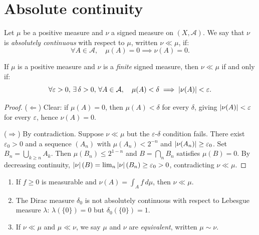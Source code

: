\section{Absolute continuity}

\begin{definition}
\label{def:abs_cont}
Let $\mu$ be a positive measure and $\nu$ a signed measure on $(X, \mathcal{A})$.
We say that $\nu$ is \emph{absolutely continuous} with respect to $\mu$, written
$\nu \ll \mu$\index{$\ll$}, if:
\[
    \forall A \in \mathcal{A}, \quad \mu(A) = 0 \implies \nu(A) = 0.
\]
\end{definition}

\begin{proposition}
\label{prop:eps_delta}
If $\mu$ is a positive measure and $\nu$ is a \emph{finite} signed measure, then
$\nu \ll \mu$ if and only if:
\[
    \forall \varepsilon > 0,\, \exists\, \delta > 0,\, \forall A \in \mathcal{A},\quad
    \mu(A) < \delta \implies \left| \nu(A) \right| < \varepsilon.
\]
\end{proposition}

\begin{proof}
($\Leftarrow$) Clear: if $\mu(A) = 0$, then $\mu(A) < \delta$ for every $\delta$,
giving $\left| \nu(A) \right| < \varepsilon$ for every $\varepsilon$, hence $\nu(A) = 0$.

($\Rightarrow$) By contradiction. Suppose $\nu \ll \mu$ but the $\varepsilon$-$\delta$
condition fails. There exist $\varepsilon_0 > 0$ and a sequence $(A_n)$ with
$\mu(A_n) < 2^{-n}$ and $\left| \nu(A_n) \right| \geq \varepsilon_0$. Set
$B_n = \bigcup_{k \geq n} A_k$. Then $\mu(B_n) \leq 2^{1-n}$ and
$B = \bigcap_n B_n$ satisfies $\mu(B) = 0$. By decreasing continuity,
$\left| \nu \right|(B) = \lim_n \left| \nu \right|(B_n) \geq \varepsilon_0 > 0$, contradicting
$\nu \ll \mu$.
\end{proof}

\begin{example}
\begin{enumerate}
    \item If $f \geq 0$ is measurable and $\nu(A) = \int_A f\, d\mu$, then $\nu \ll \mu$.
    \item The Dirac measure $\delta_0$ is not absolutely continuous with respect to
    Lebesgue measure $\lambda$: $\lambda(\{0\}) = 0$ but $\delta_0(\{0\}) = 1$.
    \item If $\nu \ll \mu$ and $\mu \ll \nu$, we say $\mu$ and $\nu$ are
    \emph{equivalent}, written $\mu \sim \nu$.
\end{enumerate}
\end{example}

